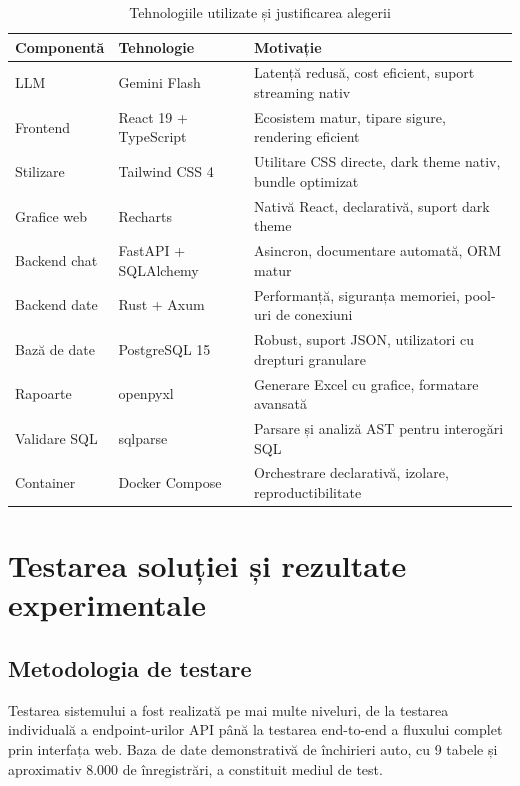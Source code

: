 \documentclass[12pt, a4paper]{report}
\begin{document}
\begin{table}[H]
\centering
\caption{Tehnologiile utilizate și justificarea alegerii}
\label{tab:tehnologii}
\begin{tabularx}{\textwidth}{l l X}
\toprule
\textbf{Componentă} & \textbf{Tehnologie} & \textbf{Motivație} \\
\midrule
LLM & Gemini Flash & Latență redusă, cost eficient, suport streaming nativ \\
Frontend & React 19 + TypeScript & Ecosistem matur, tipare sigure, rendering eficient \\
Stilizare & Tailwind CSS 4 & Utilitare CSS directe, dark theme nativ, bundle optimizat \\
Grafice web & Recharts & Nativă React, declarativă, suport dark theme \\
Backend chat & FastAPI + SQLAlchemy & Asincron, documentare automată, ORM matur \\
Backend date & Rust + Axum & Performanță, siguranța memoriei, pool-uri de conexiuni \\
Bază de date & PostgreSQL 15 & Robust, suport JSON, utilizatori cu drepturi granulare \\
Rapoarte & openpyxl & Generare Excel cu grafice, formatare avansată \\
Validare SQL & sqlparse & Parsare și analiză AST pentru interogări SQL \\
Container & Docker Compose & Orchestrare declarativă, izolare, reproductibilitate \\
\bottomrule
\end{tabularx}
\end{table}


\chapter{Testarea soluției și rezultate experimentale}

\section{Metodologia de testare}

Testarea sistemului a fost realizată pe mai multe niveluri, de la testarea individuală a endpoint-urilor API până la testarea end-to-end a fluxului complet prin interfața web. Baza de date demonstrativă de închirieri auto, cu 9 tabele și aproximativ 8.000 de înregistrări, a constituit mediul de test.
\end{document}
